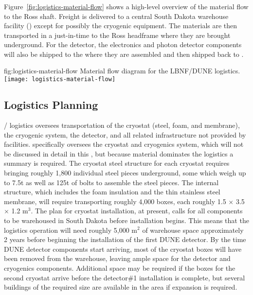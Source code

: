 Figure~\ref{fig:logistics-material-flow} shows a high-level overview of the material flow to the Ross shaft. Freight is delivered to a central South Dakota warehouse facility () except for possibly the cryogenic equipment. 
 The materials are then transported in a just-in-time to the Ross headframe where they are brought underground. For the detector, the  electronics and photon detector components will also be shipped to the  where they are assembled and then shipped back to .
 
\begin{dunefigure}{fig:logistics-material-flow}
  {Material flow diagram for the LBNF/DUNE logistics.}
 \texttt{[image: logistics-material-flow]}
\end{dunefigure}


\subsection{Logistics Planning}
\label{sec:fdsp-tc-logPln}
/ logistics oversees transportation of the cryostat (steel, foam, and membrane), the cryogenic system, the detector, and all related infrastructure not provided by facilities.  specifically oversees the cryostat and cryogenics system, which will not be discussed in detail in this , but because  material dominates the logistics a summary is required. The cryostat steel structure for each cryostat requires bringing roughly 1,800 individual steel pieces underground, some which weigh up to 7.5t as well as 125t of bolts to assemble the steel pieces. The internal structure, which includes the foam insulation and the thin stainless steel membrane, will require transporting roughly 4,000 boxes, each roughly 1.5 $\times$ 3.5 $\times$ 1.2 m$^3$. The plan for cryostat installation, at present, calls for all components to be warehoused in South Dakota before installation begins. This means that the logistics operation will need roughly 5,000 m$^2$ of warehouse space approximately 2 years before beginning the installation of the first DUNE detector. By the time DUNE detector components start arriving, most of the cryostat boxes will have been removed from the warehouse, leaving ample space for the detector and cryogenics components. Additional space may be required if the boxes for the second cryostat arrive before the detector\#1 installation is complete, but several buildings of the required size are available in the area if expansion is required.


